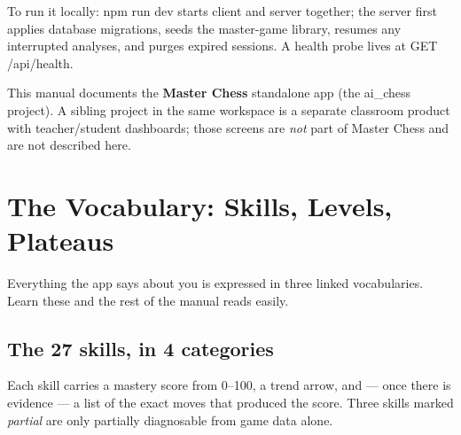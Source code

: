 \documentclass[11pt]{article}
\newcommand{\code}[1]{{\ttfamily #1}}
\begin{document}
To run it locally: \code{npm run dev} starts client and server together; the
server first applies database migrations, seeds the master-game library,
resumes any interrupted analyses, and purges expired sessions. A health probe
lives at \code{GET /api/health}.

\begin{notebox}
This manual documents the \textbf{Master Chess} standalone app (the
\code{ai\_chess} project). A sibling project in the same workspace is a separate
classroom product with teacher/student dashboards; those screens are \emph{not}
part of Master Chess and are not described here.
\end{notebox}

\section{The Vocabulary: Skills, Levels, Plateaus}

Everything the app says about you is expressed in three linked vocabularies.
Learn these and the rest of the manual reads easily.

\subsection{The 27 skills, in 4 categories}

Each skill carries a mastery score from 0--100, a trend arrow, and --- once
there is evidence --- a list of the exact moves that produced the score. Three
skills marked \textit{partial} are only partially diagnosable from game data
alone.
\end{document}
